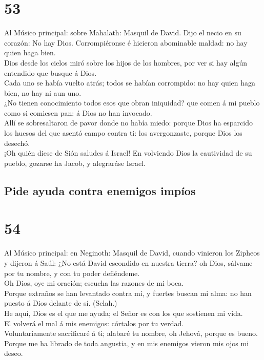 \hypertarget{section-52}{%
\section{53}\label{section-52}}

 Al Músico principal: sobre Mahalath: Masquil de David.
Dijo el necio en su corazón: No hay Dios. Corrompiéronse é hicieron
abominable maldad: no hay quien haga bien.\\
 Dios desde los cielos miró sobre los hijos de los
hombres, por ver si hay algún entendido que busque á Dios.\\
 Cada uno se había vuelto atrás; todos se habían
corrompido: no hay quien haga bien, no hay ni aun uno.\\
 ¿No tienen conocimiento todos esos que obran iniquidad?
que comen á mi pueblo como si comiesen pan: á Dios no han invocado.\\
 Allí se sobresaltaron de pavor donde no había miedo:
porque Dios ha esparcido los huesos del que asentó campo contra ti: los
avergonzaste, porque Dios los desechó.\\
 ¡Oh quién diese de Sión saludes á Israel! En volviendo
Dios la cautividad de su pueblo, gozarse ha Jacob, y alegraráse Israel.

\hypertarget{pide-ayuda-contra-enemigos-impuxedos}{%
\subsection{Pide ayuda contra enemigos
impíos}\label{pide-ayuda-contra-enemigos-impuxedos}}

\hypertarget{section-53}{%
\section{54}\label{section-53}}

 Al Músico principal: en Neginoth: Masquil de David,
cuando vinieron los Zipheos y dijeron á Saúl: ¿No está David escondido
en nuestra tierra? oh Dios, sálvame por tu nombre, y con tu poder
defiéndeme.\\
 Oh Dios, oye mi oración; escucha las razones de mi
boca.\\
 Porque extraños se han levantado contra mí, y fuertes
buscan mi alma: no han puesto á Dios delante de sí. (Selah.)\\
 He aquí, Dios es el que me ayuda; el Señor es con los que
sostienen mi vida.\\
 El volverá el mal á mis enemigos: córtalos por tu
verdad.\\
 Voluntariamente sacrificaré á ti; alabaré tu nombre, oh
Jehová, porque es bueno.\\
 Porque me ha librado de toda angustia, y en mis enemigos
vieron mis ojos mi deseo.

